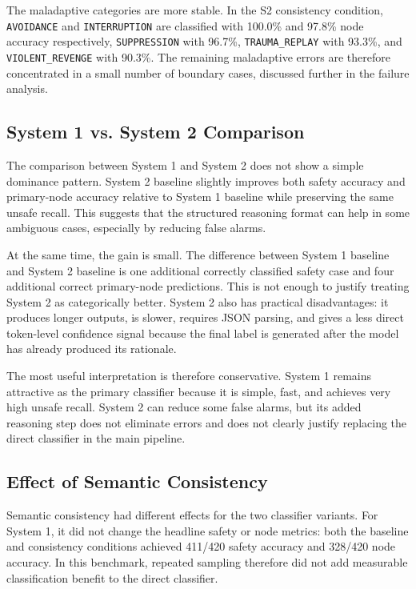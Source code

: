 The maladaptive categories are more stable. In the S2 consistency condition, \texttt{AVOIDANCE} and \texttt{INTERRUPTION} are classified with 100.0\% and 97.8\% node accuracy respectively, \texttt{SUPPRESSION} with 96.7\%, \texttt{TRAUMA\_REPLAY} with 93.3\%, and \texttt{VIOLENT\_REVENGE} with 90.3\%. The remaining maladaptive errors are therefore concentrated in a small number of boundary cases, discussed further in the failure analysis.

\subsection{System 1 vs. System 2 Comparison}

The comparison between System 1 and System 2 does not show a simple dominance pattern. System 2 baseline slightly improves both safety accuracy and primary-node accuracy relative to System 1 baseline while preserving the same unsafe recall. This suggests that the structured reasoning format can help in some ambiguous cases, especially by reducing false alarms.

At the same time, the gain is small. The difference between System 1 baseline and System 2 baseline is one additional correctly classified safety case and four additional correct primary-node predictions. This is not enough to justify treating System 2 as categorically better. System 2 also has practical disadvantages: it produces longer outputs, is slower, requires JSON parsing, and gives a less direct token-level confidence signal because the final label is generated after the model has already produced its rationale.

The most useful interpretation is therefore conservative. System 1 remains attractive as the primary classifier because it is simple, fast, and achieves very high unsafe recall. System 2 can reduce some false alarms, but its added reasoning step does not eliminate errors and does not clearly justify replacing the direct classifier in the main pipeline.

\subsection{Effect of Semantic Consistency}

Semantic consistency had different effects for the two classifier variants. For System 1, it did not change the headline safety or node metrics: both the baseline and consistency conditions achieved 411/420 safety accuracy and 328/420 node accuracy. In this benchmark, repeated sampling therefore did not add measurable classification benefit to the direct classifier.

